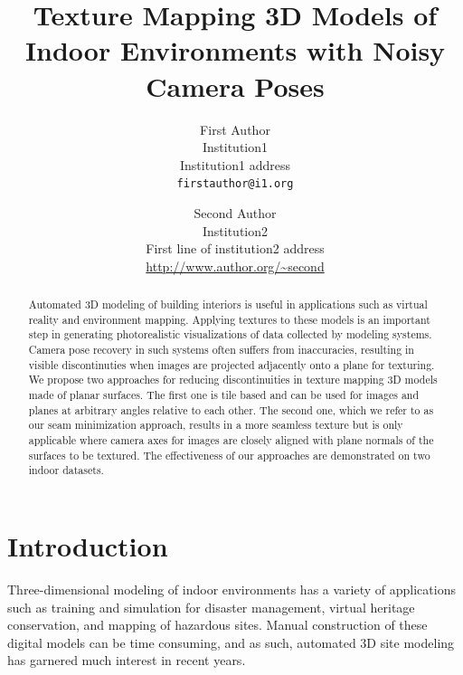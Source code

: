 \documentclass[10pt,twocolumn,letterpaper]{article}
\begin{document}
\title{Texture Mapping 3D Models of Indoor Environments with Noisy
  Camera Poses}

\author{First Author\\
  Institution1\\
  Institution1 address\\
  {\tt\small firstauthor@i1.org}
  \and
  Second Author\\
  Institution2\\
  First line of institution2 address\\
  {\small\url{http://www.author.org/~second}} }

\maketitle

\begin{abstract}
  Automated 3D modeling of building interiors is useful in
  applications such as virtual reality and environment
  mapping. Applying textures to these models is an important step in
  generating photorealistic visualizations of data collected by
  modeling systems. Camera pose recovery in such systems often suffers
  from inaccuracies, resulting in visible discontinuties when images
  are projected adjacently onto a plane for texturing. We propose two
  approaches for reducing discontinuities in texture mapping 3D models
  made of planar surfaces. The first one is tile based and can be used
  for images and planes at arbitrary angles relative to each
  other. The second one, which we refer to as our seam minimization
  approach, results in a more seamless texture but is only applicable
  where camera axes for images are closely aligned with plane normals
  of the surfaces to be textured. The effectiveness of our approaches
  are demonstrated on two indoor datasets.
\end{abstract}

\section{Introduction}
\label{sec:introduction}
Three-dimensional modeling of indoor environments has a variety of
applications such as training and simulation for disaster management,
virtual heritage conservation, and mapping of hazardous sites. Manual
construction of these digital models can be time consuming, and as
such, automated 3D site modeling has garnered much interest in recent
years.
\end{document}
